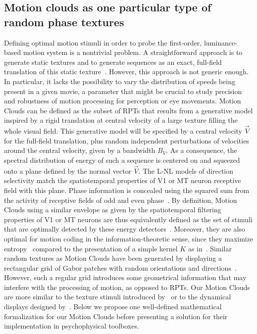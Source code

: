 \documentclass[a4paper,11pt]{article}%
\begin{document}
\subsection{Motion clouds as one particular type of random phase textures}
Defining optimal motion stimuli in order to probe the first-order, luminance-based motion system is a nontrivial problem. A straightforward approach is to generate static textures and to generate sequences as an exact, full-field translation of this static texture~\citep{Drewes08}. However, this approach is not generic enough. In particular, it lacks the possibility to vary the distribution of speeds being present in a given movie, a parameter that might be crucial to study precision and robustness of motion processing for perception or eye movements. Motion Clouds can be defined as the subset of RPTs that results from a generative model inspired by a rigid translation at central velocity of a large texture filling the whole visual field. This generative model will be specified by a central velocity $\vec{V}$ for the full-field translation, plus random independent perturbations of velocities around the central velocity, given by a bandwidth $B_V$. As a consequence, the spectral distribution of energy of such a sequence is centered on and squeezed onto a plane defined by the normal vector $\vec{V}$. The L-NL models of direction selectivity match the spatiotemporal properties of V1 or MT neuron receptive field with this plane. Phase information is concealed using the squared sum from the activity of receptive fields of odd and even phase~\citep{Adelson85}. By definition, Motion Clouds  using a similar envelope as given by the spatiotemporal filtering properties of V1 or MT neurons are thus equivalently defined as the set of stimuli that are optimally detected by these energy detectors~\citep{Nishimoto11}. Moreover, they are also optimal for motion coding in the information-theoretic sense, since they maximize entropy~\citep{Field94} compared to the presentation of a simple kernel $K$ as in~\citep{Watson95}. Similar random textures as Motion Clouds have been generated by displaying a rectangular grid of Gabor patches with random orientations and directions~\citep{Scarfe10}. However, such a regular grid introduces some geometrical information that may interfere with the processing of motion, as opposed to RPTs. %
Our Motion Clouds are more similar to the texture stimuli introduced by~\citep{Schrater00} or to the dynamical displays designed by~\citep{Tsuchiya07}. Below we propose one well-defined mathematical formalization for our Motion Clouds before presenting a solution for their implementation in psychophysical toolboxes. %
\end{document}
